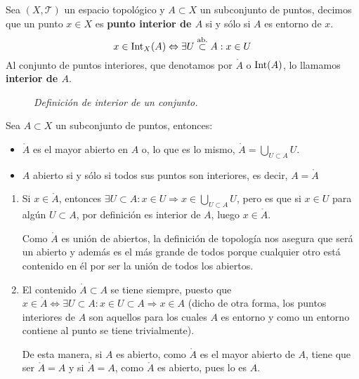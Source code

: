 \begin{defi}
Sea $(X,\mathcal{T})$ un espacio topológico y $A \subset X$ un subconjunto de puntos, decimos que un punto $x\in X$ es \textbf{punto interior de $A$} si y sólo si $A$ es entorno de $x$.
$$
x\in \operatorname{Int}_X(A) \Leftrightarrow \exists U \stackrel{\text{ab.}}{\subset} A : x \in U
$$
Al conjunto de puntos interiores, que denotamos por $\mathring{A}$ o $\operatorname{Int}(A)$, lo llamamos \textbf{interior de $A$}.
\end{defi}

\begin{figure}[H]
    \centering
    \caption{\textit{Definición de interior de un conjunto.}}
    \label{fig:definición-interior}
\end{figure}

\begin{prop}
Sea $A\subset X$ un subconjunto de puntos, entonces:
\begin{itemize}
\item $\mathring{A}$ es el mayor abierto en $A$ o, lo que es lo mismo, $ \mathring{A} = \bigcup_{U \subset A} U$.
\item $A$ abierto si y sólo si todos sus puntos son interiores, es decir, $A = \mathring{A}$
\end{itemize}
\end{prop}
\begin{demo}
\begin{enumerate}
    \item Si $x\in \mathring{A}$, entonces $\exists U \subset A : x\in U \Rightarrow x\in \bigcup_{U\subset A}U$, pero es que si $x\in U$ para algún $U\subset A$, por definición es interior de $A$, luego $x\in \mathring{A}$.
   
   Como $\mathring{A}$ es unión de abiertos, la definición de topología nos asegura que será un abierto y además es el más grande de todos porque cualquier otro está contenido en él por ser la unión de todos los abiertos.   
   \item El contenido $\mathring{A}\subset A$ se tiene siempre, puesto que $x\in \mathring{A}\Leftrightarrow \exists U \subset A : x\in U \subset A \Rightarrow x\in A$ (dicho de otra forma, los puntos interiores de $A$ son aquellos para los cuales $A$ es entorno y como un entorno contiene al punto se tiene trivialmente).
   
   De esta manera, si $A$ es abierto, como $\mathring{A}$ es el mayor abierto de $A$, tiene que ser $\mathring{A} = A$ y si $\mathring{A} = A$, como $\mathring{A}$ es abierto, pues lo es $A$.
\end{enumerate}
\end{demo}

